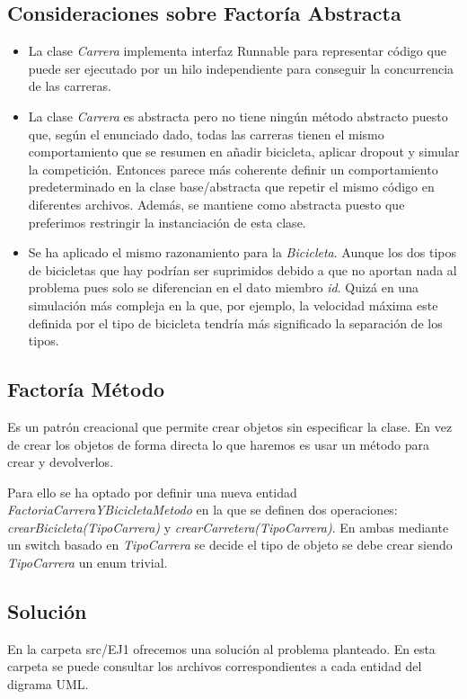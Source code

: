 \documentclass{article}
\begin{document}
	\subsection{Consideraciones sobre Factoría Abstracta}
	\begin{itemize}
		\item La clase \textit{Carrera} implementa interfaz Runnable para representar código que puede ser ejecutado por un hilo independiente para conseguir la concurrencia de las carreras.
		\item La clase \textit{Carrera} es abstracta pero no tiene ningún método abstracto puesto que, según el enunciado dado, todas las carreras tienen el mismo comportamiento que se resumen en añadir bicicleta, aplicar dropout y simular la competición. Entonces parece más coherente definir un comportamiento predeterminado en la clase base/abstracta que repetir el mismo código en diferentes archivos. Además, se mantiene como abstracta puesto que preferimos restringir la instanciación de esta clase. 
		\item Se ha aplicado el mismo razonamiento para la \textit{Bicicleta}. Aunque los dos tipos de bicicletas que hay podrían ser suprimidos debido a que no aportan nada al problema pues solo se diferencian en el dato miembro \textit{id}. Quizá en una simulación más compleja en la que, por ejemplo, la velocidad máxima este definida por el tipo de bicicleta tendría más significado la separación de los tipos.
	\end{itemize}


\subsection{Factoría Método}
  Es un patrón creacional que permite crear objetos sin especificar la clase. En vez de crear los objetos de forma directa lo que haremos es usar un método para crear y devolverlos. 
	
	Para ello se ha optado por definir una nueva entidad \textit{FactoriaCarreraYBicicletaMetodo} en la que se definen dos operaciones: \textit{crearBicicleta(TipoCarrera)} y \textit{crearCarretera(TipoCarrera)}. En ambas mediante un switch basado en \textit{TipoCarrera} se decide el tipo de objeto se debe crear siendo \textit{TipoCarrera} un enum trivial.  
	
\subsection{Solución}
En la carpeta src/EJ1  ofrecemos una solución al problema planteado. En esta carpeta se puede consultar los archivos correspondientes a cada entidad del digrama UML. \\
\end{document}
